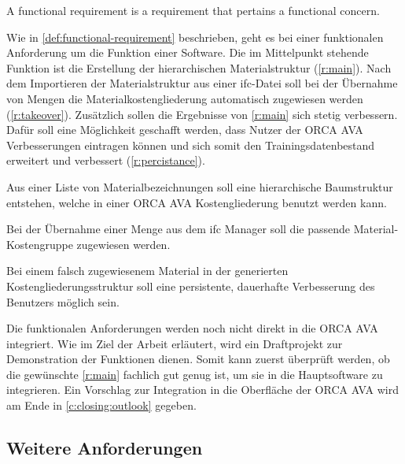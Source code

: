 \begin{definition}
	\label{def:functional-requirement}
	\glqq A functional requirement is a requirement	that pertains a functional concern.\grqq{}\citep{glinz_2007}
\end{definition}

Wie in \autoref{def:functional-requirement} beschrieben, geht es bei einer funktionalen Anforderung um die Funktion einer Software. Die im Mittelpunkt stehende Funktion ist die Erstellung der hierarchischen Materialstruktur (\autoref{r:main}). Nach dem Importieren der Materialstruktur aus einer \ac{ifc}-Datei soll bei der Übernahme von Mengen die Materialkostengliederung automatisch zugewiesen werden (\autoref{r:takeover}). Zusätzlich sollen die Ergebnisse von \autoref{r:main} sich stetig verbessern. Dafür soll eine Möglichkeit geschafft werden, dass Nutzer der ORCA AVA Verbesserungen eintragen können und sich somit den Trainingsdatenbestand erweitert und verbessert (\autoref{r:percistance}).

\begin{requirement}
	\label{r:main}
	Aus einer Liste von Materialbezeichnungen soll eine hierarchische Baumstruktur entstehen, welche in einer ORCA AVA Kostengliederung benutzt werden kann.
\end{requirement}

\begin{requirement}
	\label{r:takeover}
	Bei der Übernahme einer Menge aus dem \ac{ifc} Manager soll die passende Material-Kostengruppe zugewiesen werden.
\end{requirement}

\begin{requirement}
	\label{r:percistance}
	Bei einem falsch zugewiesenem Material in der generierten Kostengliederungsstruktur soll eine persistente, dauerhafte Verbesserung des Benutzers möglich sein.
\end{requirement}

Die funktionalen Anforderungen werden noch nicht direkt in die ORCA AVA integriert. Wie im Ziel der Arbeit erläutert, wird ein Draftprojekt zur Demonstration der Funktionen dienen. Somit kann zuerst überprüft werden, ob die gewünschte \autoref{r:main} fachlich gut genug ist, um sie in die Hauptsoftware zu integrieren. Ein Vorschlag zur Integration in die Oberfläche der ORCA AVA wird am Ende in \autoref{c:closing:outlook} gegeben.



\subsection{Weitere Anforderungen}
\label{c:requirements:requirements:additional}

